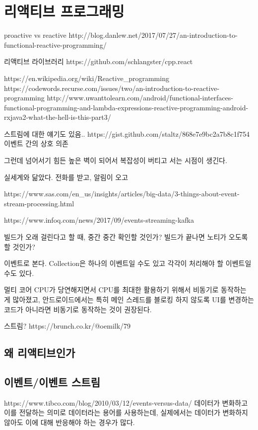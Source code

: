 \documentclass{book}
\begin{document}
\section{리액티브 프로그래밍}
proactive vs reactive
http://blog.danlew.net/2017/07/27/an-introduction-to-functional-reactive-programming/

리액티브 라이브러리
https://github.com/schlangster/cpp.react

https://en.wikipedia.org/wiki/Reactive_programming
https://codewords.recurse.com/issues/two/an-introduction-to-reactive-programming
http://www.uwanttolearn.com/android/functional-interfaces-functional-programming-and-lambda-expressions-reactive-programming-android-rxjava2-what-the-hell-is-this-part3/

스트림에 대한  얘기도 있음..
https://gist.github.com/staltz/868e7e9bc2a7b8c1f754
이벤트 간의 상호 의존

그런데 넘어서기 힘든 높은 벽이 되어서 복잡성이 버티고 서는 시점이 생긴다.

실세계와 닮았다.
전화를 받고, 알림이 오고

https://www.sas.com/en_us/insights/articles/big-data/3-things-about-event-stream-processing.html

https://www.infoq.com/news/2017/09/events-streaming-kafka

빌드가 오래 걸린다고 할 때, 중간 중간 확인할 것인가? 빌드가 끝나면 노티가 오도록 할 것인가?

이벤트로 본다. 
Collection은 하나의 이벤트일 수도 있고 각각이 처리해야 할 이벤트일 수도 있다.

멀티 코어 CPU가 당연해지면서 CPU를 최대한 활용하기 위해서 비동기로 동작하는 게  많아졌고, 안드로이드에서는 특히 메인 스레드를 블로킹 하지 않도록 UI를 변경하는 코드가 아니라면 비동기로 동작하는 것이 권장된다.

스트림?
https://brunch.co.kr/@oemilk/79

\subsection{왜 리액티브인가}

\subsection{이벤트/이벤트 스트림}
https://www.tibco.com/blog/2010/03/12/events-versus-data/
데이터가 변화하고 이를 전달하는 의미로 데이터라는 용어를 사용하는데, 실제에서는 데이터가 변화하지 않아도 이에 대해 반응해야 하는 경우가 많다. 
\end{document}

